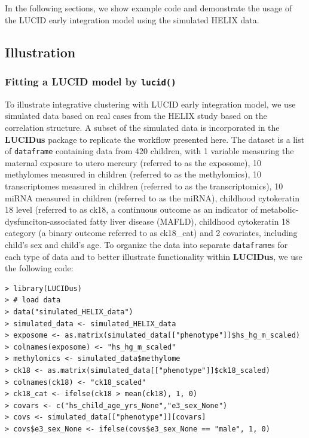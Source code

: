 In the following sections, we show example code and demonstrate the
usage of the LUCID early integration model using the simulated HELIX
data.

\subsection{Illustration}\label{sec3}

\subsubsection{\texorpdfstring{Fitting a LUCID model by \texttt{lucid()}}{Fitting a LUCID model by lucid()}}\label{sec3.1}

To illustrate integrative clustering with LUCID early integration model,
we use simulated data based on real cases from the HELIX study based on
the correlation structure. A subset of the simulated data is
incorporated in the \textbf{LUCIDus} package to replicate the workflow
presented here. The dataset is a list of \texttt{dataframe} containing data
from 420 children, with 1 variable measuring the maternal exposure to
utero mercury (referred to as the exposome), 10 methylomes measured in
children (referred to as the methylomics), 10 transcriptomes measured in
children (referred to as the transcriptomics), 10 miRNA measured in
children (referred to as the miRNA), childhood cytokeratin 18 level
(referred to as ck18, a continuous outcome as an indicator of
metabolic-dysfunciton-associated fatty liver disease (MAFLD), childhood
cytokeratin 18 category (a binary outcome referred to as ck18\_cat) and
2 covariates, including child's sex and child's age. To organize the
data into separate \texttt{dataframe}s for each type of data and to better
illustrate functionality within \textbf{LUCIDus}, we use the following code:

\begin{verbatim}
> library(LUCIDus)
> # load data
> data("simulated_HELIX_data")
> simulated_data <- simulated_HELIX_data
> exposome <- as.matrix(simulated_data[["phenotype"]]$hs_hg_m_scaled)
> colnames(exposome) <- "hs_hg_m_scaled"
> methylomics <- simulated_data$methylome
> ck18 <- as.matrix(simulated_data[["phenotype"]]$ck18_scaled)
> colnames(ck18) <- "ck18_scaled"
> ck18_cat <- ifelse(ck18 > mean(ck18), 1, 0)
> covars <- c("hs_child_age_yrs_None","e3_sex_None")
> covs <- simulated_data[["phenotype"]][covars]
> covs$e3_sex_None <- ifelse(covs$e3_sex_None == "male", 1, 0)
\end{verbatim}

